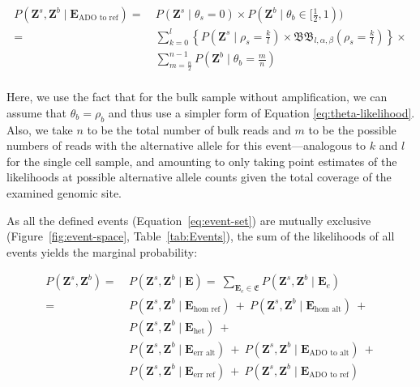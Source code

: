 \documentclass[authoryear,preprint,11pt]{scrartcl}
\newcommand{\Prob}{{P}}
\newcommand{\cB}{{\mathfrak B}}
\begin{document}
\begin{equation}
  \label{eq:ado-to-ref-likelihood-samples}
  \begin{split}
    \Prob(\boldsymbol{Z}^s,\boldsymbol{Z}^b \mid \boldsymbol{E}_{\text{ADO to ref}})
      =~&\Prob(\boldsymbol{Z}^s \mid \theta_s = 0) \times \Prob(\boldsymbol{Z}^b \mid \theta_b \in [\frac12,1))\\
      =~&\sum_{k=0}^{l} \left\{ \Prob(\boldsymbol{Z}^s \mid \rho_s = \frac{k}{l}) \times \cB\cB_{l,\alpha, \beta} (\rho_s = \frac{k}{l}) \right\} \times\\
        &\sum_{m=\frac{n}{2}}^{n-1} \Prob(\boldsymbol{Z}^b \mid \theta_b = \frac{m}{n})\\
  \end{split}
\end{equation}

Here, we use the fact that for the bulk sample without amplification, we can assume that $\theta_b = \rho_b$ and thus use a simpler form of Equation \ref{eq:theta-likelihood}.
Also, we take $n$ to be the total number of bulk reads and $m$ to be the possible numbers of reads with the alternative allele for this event---analogous to $k$ and $l$ for the single cell sample, and amounting to only taking point estimates of the likelihoods at possible alternative allele counts given the total coverage of the examined genomic site.

As all the defined events (Equation~\ref{eq:event-set}) are mutually exclusive (Figure~\ref{fig:event-space}, Table~\ref{tab:Events}), the sum of the likelihoods of all events yields the marginal probability:

\begin{equation}
  \label{eq:marginal-prob}
  \begin{split}
    \Prob(\boldsymbol{Z}^s,\boldsymbol{Z}^b)
      =~&\Prob(\boldsymbol{Z}^s,\boldsymbol{Z}^b \mid \boldsymbol{E})     =~\sum_{\boldsymbol{E}_e \in \mathfrak{E}}{\Prob(\boldsymbol{Z}^s,\boldsymbol{Z}^b \mid \boldsymbol{E}_e)}\\
      =~&\Prob(\boldsymbol{Z}^s,\boldsymbol{Z}^b \mid \boldsymbol{E}_{\text{hom ref}})~+~ \Prob(\boldsymbol{Z}^s,\boldsymbol{Z}^b \mid \boldsymbol{E}_{\text{hom alt}})~+\\
        &\Prob(\boldsymbol{Z}^s,\boldsymbol{Z}^b \mid \boldsymbol{E}_{\text{het}})~+\\
        &\Prob(\boldsymbol{Z}^s,\boldsymbol{Z}^b \mid \boldsymbol{E}_{\text{err alt}})~+~ \Prob(\boldsymbol{Z}^s,\boldsymbol{Z}^b \mid \boldsymbol{E}_{\text{ADO to alt}})~+\\
        &\Prob(\boldsymbol{Z}^s,\boldsymbol{Z}^b \mid \boldsymbol{E}_{\text{err ref}})~+~ \Prob(\boldsymbol{Z}^s,\boldsymbol{Z}^b \mid \boldsymbol{E}_{\text{ADO to ref}})
  \end{split}
\end{equation}
\end{document}
